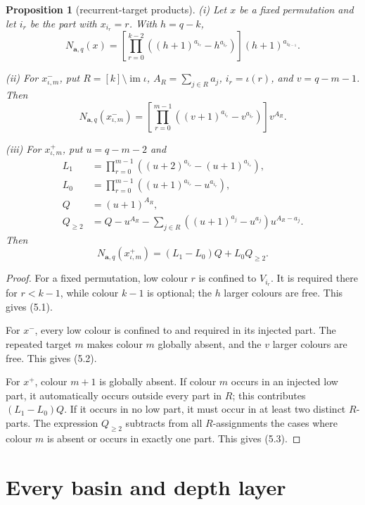 \documentclass[11pt,a4paper]{amsart}
\newtheorem{proposition}[theorem]{Proposition}
\theoremstyle{definition}
\theoremstyle{remark}
\begin{document}
\begin{proposition}[recurrent-target products]\label{prop:closed}
\textup{(i)} Let \(x\) be a fixed permutation and let \(i_r\) be the part
with \(x_{i_r}=r\).  With \(h=q-k\),
\[
 N_{\mathbf a,q}(x)=
 \left[\prod_{r=0}^{k-2}
 ((h+1)^{a_{i_r}}-h^{a_{i_r}})\right]
 (h+1)^{a_{i_{k-1}}}.                                  \tag{5.1}
\]

\textup{(ii)} For \(x^-_{\iota,m}\), put
\(R=[k]\setminus\operatorname{im}\iota\),
\(A_R=\sum_{j\in R}a_j\), \(i_r=\iota(r)\), and
\(v=q-m-1\).  Then
\[
 N_{\mathbf a,q}(x^-_{\iota,m})=
 \left[\prod_{r=0}^{m-1}
 ((v+1)^{a_{i_r}}-v^{a_{i_r}})\right]v^{A_R}.           \tag{5.2}
\]

\textup{(iii)} For \(x^+_{\iota,m}\), put \(u=q-m-2\) and
\begin{align*}
 L_1&=\prod_{r=0}^{m-1}
 ((u+2)^{a_{i_r}}-(u+1)^{a_{i_r}}),\\
 L_0&=\prod_{r=0}^{m-1}
 ((u+1)^{a_{i_r}}-u^{a_{i_r}}),\\
 Q&=(u+1)^{A_R},\\
 Q_{\ge2}&=Q-u^{A_R}
 -\sum_{j\in R}((u+1)^{a_j}-u^{a_j})u^{A_R-a_j}.
\end{align*}
Then
\[
 N_{\mathbf a,q}(x^+_{\iota,m})=(L_1-L_0)Q+L_0Q_{\ge2}. \tag{5.3}
\]
\end{proposition}

\begin{proof}
For a fixed permutation, low colour \(r\) is confined to \(V_{i_r}\).
It is required there for \(r<k-1\), while colour \(k-1\) is optional; the
\(h\) larger colours are free.  This gives (5.1).

For \(x^-\), every low colour is confined to and required in its injected
part.  The repeated target \(m\) makes colour \(m\) globally absent, and the
\(v\) larger colours are free.  This gives (5.2).

For \(x^+\), colour \(m+1\) is globally absent.  If colour \(m\) occurs in
an injected low part, it automatically occurs outside every part in \(R\);
this contributes \((L_1-L_0)Q\).  If it occurs in no low part, it must occur
in at least two distinct \(R\)-parts.  The expression \(Q_{\ge2}\) subtracts
from all \(R\)-assignments the cases where colour \(m\) is absent or occurs
in exactly one part.  This gives (5.3).
\end{proof}

\section{Every basin and depth layer}
\end{document}
